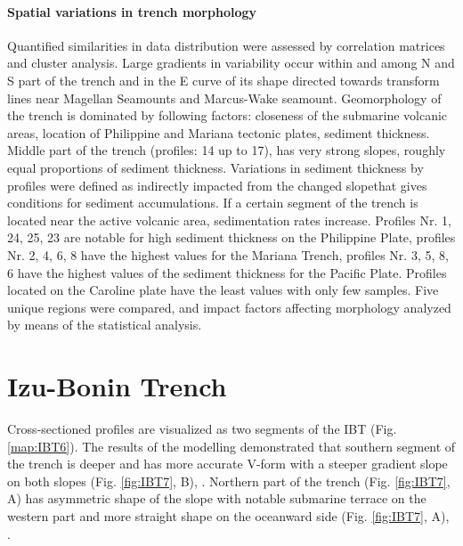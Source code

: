 \documentclass[11pt,a4paper]{report}
\begin{document}
{\paragraph{Spatial variations in trench morphology}
Quantified similarities in data distribution were assessed by correlation matrices and cluster analysis. Large gradients in variability occur within and among N and S part of the trench and in the E curve of its shape directed towards  transform lines near Magellan Seamounts and Marcus-Wake seamount. Geomorphology of the trench is dominated by following factors: closeness of the submarine volcanic areas, location of Philippine and Mariana tectonic plates, sediment thickness. Middle part of the trench (profiles: 14 up to 17), has very strong slopes, roughly equal proportions of sediment thickness. Variations in sediment thickness by profiles were defined as indirectly impacted from the changed slope\degree\space that gives conditions for sediment accumulations. If a certain segment of the trench is located near the active volcanic area, sedimentation rates increase. Profiles Nr. 1, 24, 25, 23 are notable for high sediment thickness on the Philippine Plate, profiles Nr. 2, 4, 6, 8 have the highest values for the Mariana Trench, profiles Nr. 3, 5, 8, 6 have the highest values of the sediment thickness for the Pacific Plate. Profiles located on the Caroline plate have the least values with only few samples. Five unique regions were compared, and impact factors affecting morphology analyzed by means of the statistical analysis.

\pagebreak
\section{Izu-Bonin Trench}

Cross-sectioned profiles are visualized as two segments of the \ac{IBT} (Fig. \ref{map:IBT6}). The results of the modelling demonstrated that southern segment of the trench is deeper and has more accurate V-form with a steeper gradient slope on both slopes (Fig. \ref{fig:IBT7}, B), \cite{Lemenkova202005}. Northern part of the trench (Fig. \ref{fig:IBT7}, A) has asymmetric shape of the slope with notable submarine terrace on the western part and more straight shape on the oceanward side (Fig. \ref{fig:IBT7}, A), \cite{Lemenkova202005}. 

}
\end{document}
